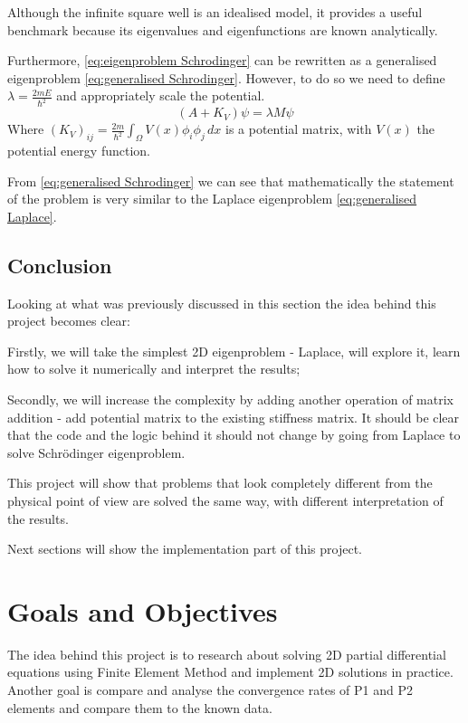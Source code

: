 \documentclass[conference]{IEEEtran}
\begin{document}
Although the infinite square well is an idealised model, it provides a useful benchmark because its eigenvalues and eigenfunctions are known analytically.

Furthermore, \ref{eq:eigenproblem Schrodinger} can be rewritten as a generalised eigenproblem \ref{eq:generalised Schrodinger}. However, to do so we need to define $\lambda = \frac{2mE}{\hbar^2}$ and appropriately scale the potential.
\begin{equation}
    (A + K_V)\psi = \lambda M\psi
    \label{eq:generalised Schrodinger}
\end{equation}
Where $(K_V)_{ij} = \frac{2m}{\hbar^2} \int_\Omega V(x)\phi_i\phi_j \, dx$ is a potential matrix, with $V(x)$ the potential energy function.

From \ref{eq:generalised Schrodinger} we can see that mathematically the statement of the problem is very similar to the Laplace eigenproblem \ref{eq:generalised Laplace}.


\subsection{Conclusion}
Looking at what was previously discussed in this section the idea behind this project becomes clear: 

Firstly, we will take the simplest 2D eigenproblem - Laplace, will explore it, learn how to solve it numerically and interpret the results;

Secondly, we will increase the complexity by adding another operation of matrix addition - add potential matrix to the existing stiffness matrix. It should be clear that the code and the logic behind it should not change by going from Laplace to solve Schr\"{o}dinger eigenproblem.

This project will show that problems that look completely different from the physical point of view are solved the same way, with different interpretation of the results. 

Next sections will show the implementation part of this project.



\section{Goals and Objectives}

The idea behind this project is to research about solving 2D partial differential equations using Finite Element Method and implement 2D solutions in practice. Another goal is compare and analyse the convergence rates of P1 and P2 elements and compare them to the known data.
\end{document}
